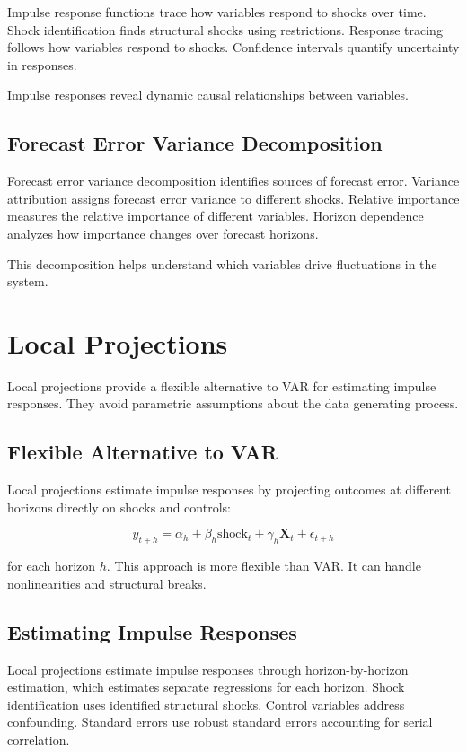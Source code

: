 Impulse response functions trace how variables respond to shocks over time. Shock identification finds structural shocks using restrictions. Response tracing follows how variables respond to shocks. Confidence intervals quantify uncertainty in responses.

Impulse responses reveal dynamic causal relationships between variables.

\subsection{Forecast Error Variance Decomposition}

Forecast error variance decomposition identifies sources of forecast error. Variance attribution assigns forecast error variance to different shocks. Relative importance measures the relative importance of different variables. Horizon dependence analyzes how importance changes over forecast horizons.

This decomposition helps understand which variables drive fluctuations in the system.

\section{Local Projections}

Local projections provide a flexible alternative to VAR for estimating impulse responses. They avoid parametric assumptions about the data generating process.

\subsection{Flexible Alternative to VAR}

Local projections estimate impulse responses by projecting outcomes at different horizons directly on shocks and controls:

\[
y_{t+h} = \alpha_h + \beta_h \text{shock}_t + \gamma_h \mathbf{X}_t + \epsilon_{t+h}
\]

for each horizon \(h\). This approach is more flexible than VAR. It can handle nonlinearities and structural breaks.

\subsection{Estimating Impulse Responses}

Local projections estimate impulse responses through horizon-by-horizon estimation, which estimates separate regressions for each horizon. Shock identification uses identified structural shocks. Control variables address confounding. Standard errors use robust standard errors accounting for serial correlation.

